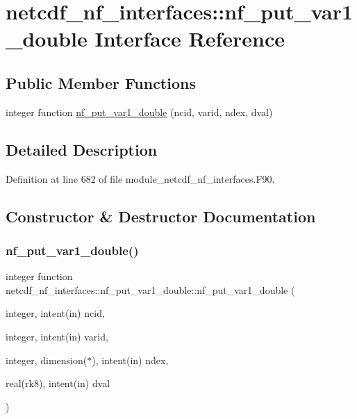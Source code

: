 \hypertarget{interfacenetcdf__nf__interfaces_1_1nf__put__var1__double}{}\section{netcdf\+\_\+nf\+\_\+interfaces\+:\+:nf\+\_\+put\+\_\+var1\+\_\+double Interface Reference}
\label{interfacenetcdf__nf__interfaces_1_1nf__put__var1__double}
\subsection*{Public Member Functions}
\begin{DoxyCompactItemize}
\item 
integer function \hyperlink{interfacenetcdf__nf__interfaces_1_1nf__put__var1__double_a41c4c29794faf25a609e3dc2485453eb}{nf\+\_\+put\+\_\+var1\+\_\+double} (ncid, varid, ndex, dval)
\end{DoxyCompactItemize}


\subsection{Detailed Description}


Definition at line 682 of file module\+\_\+netcdf\+\_\+nf\+\_\+interfaces.\+F90.



\subsection{Constructor \& Destructor Documentation}
\mbox{\label{interfacenetcdf__nf__interfaces_1_1nf__put__var1__double_a41c4c29794faf25a609e3dc2485453eb}} 
\subsubsection{\texorpdfstring{nf\+\_\+put\+\_\+var1\+\_\+double()}{nf\_put\_var1\_double()}}
{\footnotesize\ttfamily integer function netcdf\+\_\+nf\+\_\+interfaces\+::nf\+\_\+put\+\_\+var1\+\_\+double\+::nf\+\_\+put\+\_\+var1\+\_\+double (\begin{DoxyParamCaption}\item[{integer, intent(in)}]{ncid,  }\item[{integer, intent(in)}]{varid,  }\item[{integer, dimension($\ast$), intent(in)}]{ndex,  }\item[{real(rk8), intent(in)}]{dval }\end{DoxyParamCaption})}



